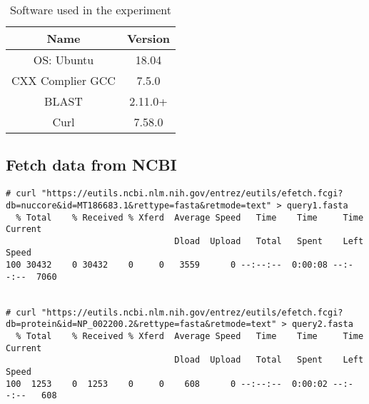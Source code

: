 \documentclass[en,black,10pt,normal]{elegantnote}
\begin{document}
\begin{table}[H]
    \caption{Software used in the experiment}
    \centering
    \begin{tabular}{cc}
        \toprule
        Name&Version\\
        \midrule
        OS: Ubuntu&18.04\\
        CXX Complier GCC&7.5.0\\
        BLAST&2.11.0+\\
        Curl&7.58.0\\
        \bottomrule
    \end{tabular}
\end{table}

\subsection{Fetch data from NCBI}
\begin{lstlisting}
# curl "https://eutils.ncbi.nlm.nih.gov/entrez/eutils/efetch.fcgi?db=nuccore&id=MT186683.1&rettype=fasta&retmode=text" > query1.fasta 
  % Total    % Received % Xferd  Average Speed   Time    Time     Time  Current
                                 Dload  Upload   Total   Spent    Left  Speed
100 30432    0 30432    0     0   3559      0 --:--:--  0:00:08 --:--:--  7060


# curl "https://eutils.ncbi.nlm.nih.gov/entrez/eutils/efetch.fcgi?db=protein&id=NP_002200.2&rettype=fasta&retmode=text" > query2.fasta 
  % Total    % Received % Xferd  Average Speed   Time    Time     Time  Current
                                 Dload  Upload   Total   Spent    Left  Speed
100  1253    0  1253    0     0    608      0 --:--:--  0:00:02 --:--:--   608
\end{lstlisting}


{}
\end{document}
